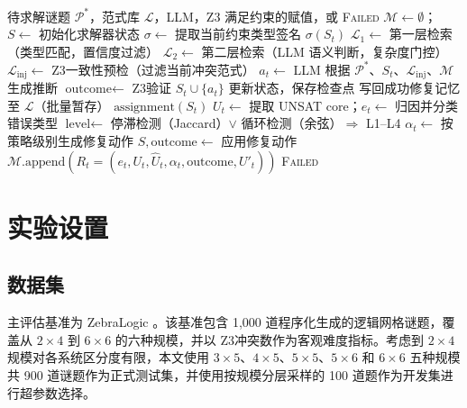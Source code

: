 \documentclass[UTF8,a4paper,12pt]{ctexart}
\newcommand{\PRISM}{PRISM}
\newcommand{\sat}{\textsc{Sat}}
\newcommand{\zthree}{Z3}
\begin{document}
\begin{algorithm}[t]
\caption{\PRISM 在线范式引导推理与修复流程。}
\label{alg:online}
\begin{algorithmic}[1]
\REQUIRE 待求解谜题 \(\mathcal{P}^*\)，范式库 \(\mathcal{L}\)，LLM，\zthree
\ENSURE 满足约束的赋值，或 \textsc{Failed}
\STATE \(\mathcal{M} \leftarrow \emptyset\)；\(S \leftarrow\) 初始化求解器状态
  \STATE \(\sigma \leftarrow\) 提取当前约束类型签名 \(\sigma(S_t)\)
  \STATE \(\mathcal{L}_1 \leftarrow\) 第一层检索（类型匹配，置信度过滤）
  \STATE \(\mathcal{L}_2 \leftarrow\) 第二层检索（LLM 语义判断，复杂度门控）
  \STATE \(\mathcal{L}_{\text{inj}} \leftarrow\) \zthree 一致性预检（过滤当前冲突范式）
  \STATE \(a_t \leftarrow\) LLM 根据 \(\mathcal{P}^*\)、\(S_t\)、\(\mathcal{L}_{\text{inj}}\)、\(\mathcal{M}\) 生成推断
  \STATE \(\text{outcome} \leftarrow\) \zthree 验证 \(S_t \cup \{a_t\}\)
  \IF{\(\text{outcome} = \sat\)}
    \STATE 更新状态，保存检查点
      \STATE 写回成功修复记忆至 \(\mathcal{L}\)（批量暂存）
      \RETURN \(\text{assignment}(S_t)\)
    \ENDIF
  \ELSE
    \STATE \(U_t \leftarrow\) 提取 UNSAT core；\(e_t \leftarrow\) 归因并分类错误类型
    \STATE \(\text{level} \leftarrow\) 停滞检测（Jaccard）\(\vee\) 循环检测（余弦）\(\Rightarrow\) L1–L4
    \STATE \(\alpha_t \leftarrow\) 按策略级别生成修复动作
    \STATE \(S, \text{outcome} \leftarrow\) 应用修复动作
    \STATE \(\mathcal{M}.\text{append}(R_t = (e_t, U_t, \hat{U}_t, \alpha_t, \text{outcome}, U'_t))\)
  \ENDIF
\ENDFOR
\RETURN \textsc{Failed}
\end{algorithmic}
\end{algorithm}

\section{实验设置}

\subsection{数据集}

主评估基准为 ZebraLogic \cite{lin2025}。该基准包含 1,000 道程序化生成的逻辑网格谜题，覆盖从 \(2\times4\) 到 \(6\times6\) 的六种规模，并以 \zthree 冲突数作为客观难度指标。考虑到 \(2\times4\) 规模对各系统区分度有限，本文使用 \(3\times5\)、\(4\times5\)、\(5\times5\)、\(5\times6\) 和 \(6\times6\) 五种规模共 900 道谜题作为正式测试集，并使用按规模分层采样的 100 道题作为开发集进行超参数选择。
\end{document}
